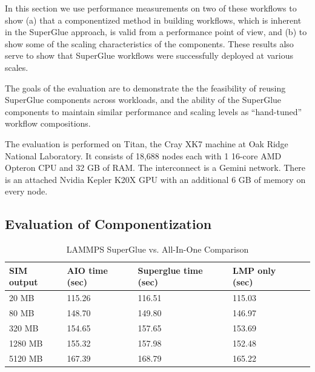 In this section we use
performance measurements on two of these workflows
to show (a) that a componentized method in
building workflows, which is inherent in the SuperGlue approach,
is valid from a performance point of view,
and (b) to show some of the scaling characteristics
of the components.
These results also serve to show that
SuperGlue workflows were successfully
deployed at various
scales.

The goals of the evaluation are to demonstrate the  the feasibility of reusing
  SuperGlue components across workloads, and the ability of the
  SuperGlue components to maintain similar performance and scaling
levels as ``hand-tuned'' workflow compositions. 
\fi

The evaluation is performed on Titan, the Cray XK7 machine at Oak Ridge
National Laboratory. It consists of 18,688 nodes each with 1 16-core AMD
Opteron CPU and 32 GB of RAM. The interconnect is a Gemini network. There is an
attached Nvidia Kepler K20X GPU with an additional 6 GB of memory on every
node.

\subsection{Evaluation of Componentization}

\begin{table}[tbp]
  \centering
  \caption{LAMMPS SuperGlue vs. All-In-One Comparison}
  \label{tab:aio}
  \vspace{-0.07in}
  \begin{tabular}{|l|l|l|l|l|}
    \hline
    SIM output & AIO time (sec) & Superglue time (sec) & LMP only (sec) \\
    \hline
    20 MB & 115.26 & 116.51 & 115.03\\
    \hline
    80 MB & 148.70 & 149.80 & 146.97\\
    \hline
    320 MB & 154.65 & 157.65 & 153.69\\
    \hline
    1280 MB & 155.32 & 157.98 & 152.48\\
    \hline
    5120 MB & 167.39 & 168.79 & 165.22\\
    \hline
  \end{tabular}
  \vspace{-0.15in}
\end{table}

